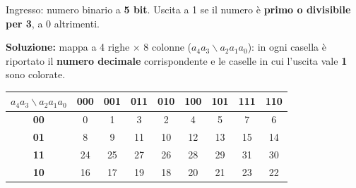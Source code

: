 \documentclass[12pt, a4paper]{article}
\begin{document}
\begin{tcolorbox}[colback=lightergray!10, colframe=tocsec, title=\textbf{Esercizio: numeri primi (o quasi)}]
Ingresso: numero binario a \textbf{5 bit}. Uscita a 1 se il numero è \textbf{primo o divisibile per 3}, a 0 altrimenti.
\end{tcolorbox}


\textbf{Soluzione:} mappa a 4 righe $\times$ 8 colonne ($a_4a_3 \backslash a_2a_1a_0$): in ogni casella è riportato il \textbf{numero decimale} corrispondente e le caselle in cui l'uscita vale \textbf{1} sono colorate.

\begin{center}
\renewcommand{\arraystretch}{1.25}
\begin{tabular}[t]{|c|c|c|c|c|c|c|c|c|}
\hline
\colorbox{gray!25}{\color{black}$a_4a_3\backslash a_2a_1a_0$} & \colorbox{gray!25}{\color{black}\textbf{000}} & \colorbox{gray!25}{\color{black}\textbf{001}} & \colorbox{gray!25}{\color{black}\textbf{011}} & \colorbox{gray!25}{\color{black}\textbf{010}} & \colorbox{gray!25}{\color{black}\textbf{100}} & \colorbox{gray!25}{\color{black}\textbf{101}} & \colorbox{gray!25}{\color{black}\textbf{111}} & \colorbox{gray!25}{\color{black}\textbf{110}} \\ \hline
\colorbox{gray!25}{\color{black}\textbf{00}} & 0 & \colorbox{green!30}{\color{black}1} & \colorbox{green!30}{\color{black}3} & \colorbox{green!30}{\color{black}2} & 4 & \colorbox{green!30}{\color{black}5} & \colorbox{green!30}{\color{black}7} & \colorbox{green!30}{\color{black}6} \\ \hline
\colorbox{gray!25}{\color{black}\textbf{01}} & 8 & \colorbox{green!30}{\color{black}9} & \colorbox{green!30}{\color{black}11} & 10 & \colorbox{green!30}{\color{black}12} & \colorbox{green!30}{\color{black}13} & \colorbox{green!30}{\color{black}15} & 14 \\ \hline
\colorbox{gray!25}{\color{black}\textbf{11}} & \colorbox{green!30}{\color{black}24} & 25 & \colorbox{green!30}{\color{black}27} & 26 & 28 & \colorbox{green!30}{\color{black}29} & \colorbox{green!30}{\color{black}31} & \colorbox{green!30}{\color{black}30} \\ \hline
\colorbox{gray!25}{\color{black}\textbf{10}} & 16 & \colorbox{green!30}{\color{black}17} & \colorbox{green!30}{\color{black}19} & \colorbox{green!30}{\color{black}18} & 20 & \colorbox{green!30}{\color{black}21} & \colorbox{green!30}{\color{black}23} & 22 \\ \hline
\end{tabular}
\end{center}
\end{document}
